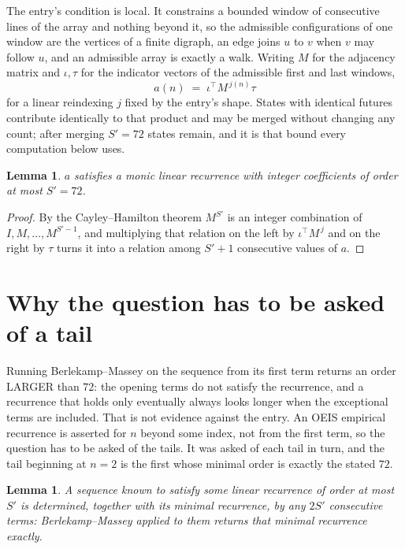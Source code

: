 \documentclass[11pt,a4paper]{article}
\theoremstyle{plain}
\newtheorem{lemma}[theorem]{Lemma}
\theoremstyle{definition}
\begin{document}
The entry's condition is local. It constrains a bounded window of consecutive lines of the
array and nothing beyond it, so the admissible configurations of one window are the vertices of
a finite digraph, an edge joins $u$ to $v$ when $v$ may follow $u$, and an admissible array is
exactly a walk. Writing $M$ for the adjacency matrix and $\iota,\tau$ for the indicator vectors
of the admissible first and last windows,
\[
a(n)\;=\;\iota^{\!\top}M^{\,j(n)}\tau
\]
for a linear reindexing $j$ fixed by the entry's shape. States with identical futures
contribute identically to that product and may be merged without changing any count; after
merging $S'=72$ states remain, and it is that bound every computation below uses.

\begin{lemma}\label{lem:cf}
$a$ satisfies a monic linear recurrence with integer coefficients of order at most $S'=72$.
\end{lemma}

\begin{proof}
By the Cayley--Hamilton theorem $M^{S'}$ is an integer combination of $I,M,\dots,M^{S'-1}$,
and multiplying that relation on the left by $\iota^{\!\top}M^{\,j}$ and on the right by
$\tau$ turns it into a relation among $S'+1$ consecutive values of $a$.
\end{proof}

\section{Why the question has to be asked of a tail}

Running Berlekamp--Massey on the sequence from its first term returns an order LARGER than $72$: the opening terms do not satisfy the recurrence, and a recurrence that holds only eventually always looks longer when the exceptional terms are included. That is not evidence against the entry. An OEIS empirical recurrence is asserted for $n$ beyond some index, not from the first term, so the question has to be asked of the tails. It was asked of each tail in turn, and the tail beginning at $n=2$ is the first whose minimal order is exactly the stated $72$.

\begin{lemma}\label{lem:bm}
A sequence known to satisfy some linear recurrence of order at most $S'$ is determined,
together with its minimal recurrence, by any $2S'$ consecutive terms: Berlekamp--Massey applied
to them returns that minimal recurrence exactly.
\end{lemma}
\end{document}
